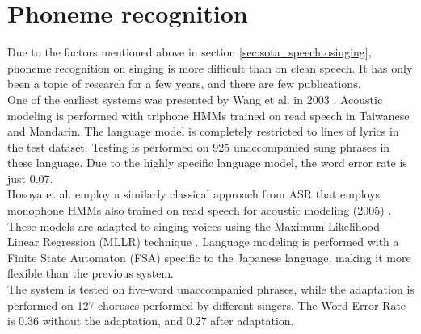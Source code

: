 \section{Phoneme recognition} \label{sec:sota_phonerec}
Due to the factors mentioned above in section \ref{sec:sota_speechtosinging}, phoneme recognition on singing is more difficult than on clean speech. It has only been a topic of research for a few years, and there are few publications.\\
One of the earliest systems was presented by Wang et al. in 2003 \cite{WangLC03}. Acoustic modeling is performed with triphone HMMs trained on read speech in Taiwanese and Mandarin. The language model is completely restricted to lines of lyrics in the test dataset. Testing is performed on 925 unaccompanied sung phrases in these language. Due to the highly specific language model, the word error rate is just $0.07$.\\

Hosoya et al. employ a similarly classical approach from ASR that employs monophone HMMs also trained on read speech for acoustic modeling (2005) \cite{Hosoya2005}. These models are adapted to singing voices using the Maximum Likelihood Linear Regression (MLLR) technique \cite{mllr}. Language modeling is performed with a Finite State Automaton (FSA) specific to the Japanese language, making it more flexible than the previous system.\\
The system is tested on five-word unaccompanied phrases, while the adaptation is performed on 127 choruses performed by different singers. The Word Error Rate is $0.36$ without the adaptation, and $0.27$ after adaptation.\\


